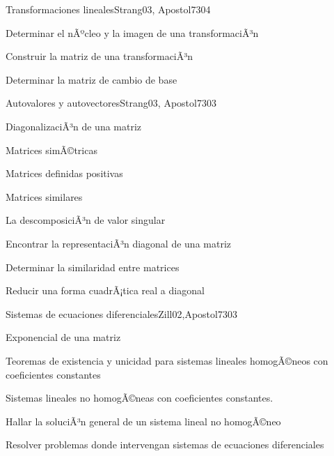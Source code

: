 \begin{syllabus}
\begin{unit}{Transformaciones lineales}{Strang03, Apostol73}{0}{4}
   \begin{learningoutcomes}
      \item Determinar el nÃºcleo y la imagen de una transformaciÃ³n
      \item Construir la matriz de una transformaciÃ³n
      \item Determinar la matriz de cambio de base
      \end{learningoutcomes}
\end{unit}

\begin{unit}{Autovalores y autovectores}{Strang03, Apostol73}{0}{3}
\begin{topics}
      \item DiagonalizaciÃ³n de una matriz
      \item Matrices simÃ©tricas
      \item Matrices definidas positivas
      \item Matrices similares
      \item La descomposiciÃ³n de valor singular
  \end{topics}

   \begin{learningoutcomes}
      \item Encontrar la representaciÃ³n diagonal de una matriz
      \item Determinar la similaridad entre matrices
      \item Reducir una forma cuadrÃ¡tica real a diagonal
   \end{learningoutcomes}
\end{unit}

\begin{unit}{Sistemas de ecuaciones diferenciales}{Zill02,Apostol73}{0}{3}
\begin{topics}
      \item Exponencial de una matriz
      \item Teoremas de existencia y unicidad para sistemas lineales homogÃ©neos con coeficientes constantes
      \item Sistemas lineales no homogÃ©neas con coeficientes constantes.
    \end{topics}

   \begin{learningoutcomes}
      \item Hallar la soluciÃ³n general de un sistema lineal no  homogÃ©neo
      \item Resolver problemas donde intervengan sistemas de ecuaciones diferenciales
   \end{learningoutcomes}
\end{unit}


\end{syllabus}
